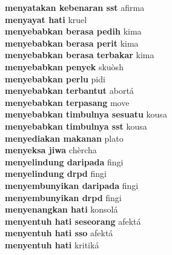\textbf{ menyatakan kebenaran sst  } afirma \\
\textbf{ menyayat hati  } kruel \\
\textbf{ menyebabkan berasa pedih  } kima \\
\textbf{ menyebabkan berasa perit  } kima \\
\textbf{ menyebabkan berasa terbakar  } kima \\
\textbf{ menyebabkan penyek  } skuòsh \\
\textbf{ menyebabkan perlu  } pidi \\
\textbf{ menyebabkan terbantut  } abortá \\
\textbf{ menyebabkan terpasang  } move \\
\textbf{ menyebabkan timbulnya sesuatu  } kousa \\
\textbf{ menyebabkan timbulnya sst  } kousa \\
\textbf{ menyediakan makanan  } plato \\
\textbf{ menyeksa jiwa  } chèrcha \\
\textbf{ menyelindung daripada  } fingi \\
\textbf{ menyelindung drpd  } fingi \\
\textbf{ menyembunyikan daripada  } fingi \\
\textbf{ menyembunyikan drpd  } fingi \\
\textbf{ menyenangkan hati  } konsolá \\
\textbf{ menyentuh hati seseorang  } afektá \\
\textbf{ menyentuh hati sso  } afektá \\
\textbf{ menyentuh hati  } kritiká \\
